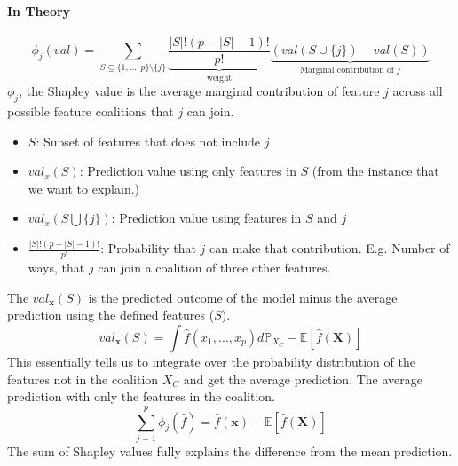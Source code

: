 \paragraph{In Theory}
\begin{equation}
	\phi_j(val)=\sum_{S\subseteq\{1,\ldots,p\} \setminus \{j\}}\underbrace{\frac{|S|!\left(p-|S|-1\right)!}{p!}}_{\text{weight}} \underbrace{\left(val\left(S\cup\{j\}\right)-val(S)\right)}_{\text{Marginal contribution of $j$}}
	\label{eq:Shapley-Values}
\end{equation}
$\phi_j$, the Shapley value is the average marginal contribution of feature $j$ across all possible feature coalitions that $j$ can join.

\begin{itemize}
	\item $S$: Subset of features that does not include $j$
	\item $val_x(S)$: Prediction value using only features in $S$ (from the instance that we want to explain.)
	\item $val_x(S  \bigcup \{j\})$: Prediction value using features in $S$ and $j$
	\item $\frac{|S|!\left(p-|S|-1\right)!}{p!}$: Probability that $j$ can make that contribution. E.g. Number of ways, that $j$ can join a coalition of three other features.
\end{itemize}

The $val_\textbf{x}(S)$ is the predicted outcome of the model minus the average prediction using the defined features ($S$).
\begin{equation}
	val_{\mathbf{x}}(S)=\int\hat{f}(x_{1},\ldots,x_{p})d\mathbb{P}_{X_C}-\mathbb{E}[\hat{f}(\mathbf{X})]
	\label{eq:shap-val-function}
\end{equation}
This essentially tells us to integrate over the probability distribution of the features not in the coalition $X_C$ and get the average prediction.
The average prediction with only the features in the coalition.
\begin{equation}
	\sum_{j=1}^{p}\phi_j(\hat{f}) = \hat{f}(\mathbf{x})-\mathbb{E}[\hat{f}(\mathbf{X})]
	\label{eq:sumofshapley}
\end{equation}
The sum of Shapley values fully explains the difference from the mean prediction.

